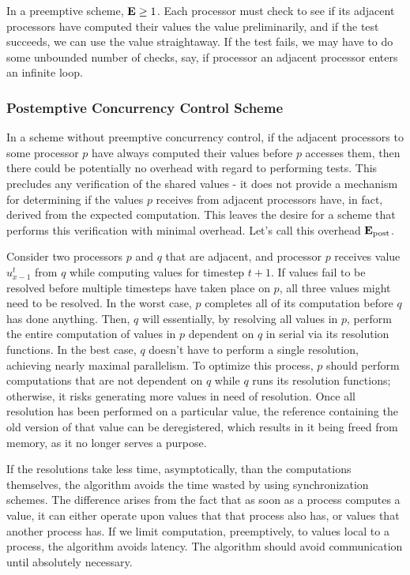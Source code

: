 In a preemptive scheme, $\mathbf{E} \geq 1$. Each processor must check to see if its
adjacent processors have computed their values the value preliminarily, and if
the test succeeds, we can use the value straightaway. If the test fails, we may
have to do some unbounded number of checks, say, if processor an adjacent
processor enters an infinite loop.

\subsubsection{Postemptive Concurrency Control Scheme}

In a scheme without preemptive concurrency control, if the adjacent processors
to some processor $p$ have always computed their values before $p$ accesses
them, then there could be potentially no overhead with regard to performing
tests. This precludes any verification of the shared values \-- it does not
provide a mechanism for determining if the values $p$ receives from adjacent
processors have, in fact, derived from the expected computation. This leaves the
desire for a scheme that performs this verification with minimal overhead. Let's
call this overhead $\mathbf{E}_\text{post}$.

Consider two processors $p$ and $q$ that are adjacent, and processor $p$
receives value $u^{t}_{x-1}$ from $q$ while computing values for timestep
$t+1$. If values fail to be resolved before multiple
timesteps have taken place on $p$, all three values might need to be resolved.
In the worst case, $p$ completes all of its computation before $q$ has done
anything. Then, $q$ will essentially, by resolving all values in $p$, perform
the entire computation of values in $p$ dependent on $q$ in serial via its
resolution functions. In the best
case, $q$ doesn't have to perform a single resolution, achieving nearly maximal
parallelism. To optimize this process, $p$ should perform computations that are
not dependent on $q$ while $q$ runs its resolution functions; otherwise, it
risks generating more values in need of resolution. Once all resolution has been
performed on a particular value, the reference containing the old version of
that value can be deregistered, which results in it being freed from memory, as
it no longer serves a purpose.

If the resolutions take less time, asymptotically, than the computations
themselves, the algorithm avoids the time wasted by using synchronization
schemes. The difference arises from the fact that as soon as a process computes
a value, it can either operate upon values that that process also has, or values
that another process has. If we limit computation, preemptively, to values local
to a process, the algorithm avoids latency. The algorithm should avoid
communication until absolutely necessary.

